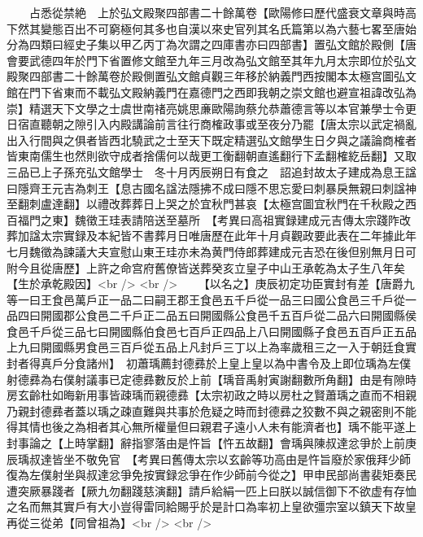 　　占悉從禁絶　上於弘文殿聚四部書二十餘萬卷【歐陽修曰歷代盛衰文章與時高下然其變態百出不可窮極何其多也自漢以來史官列其名氏篇第以為六藝七畧至唐始分為四類曰經史子集以甲乙丙丁為次謂之四庫書亦曰四部書】置弘文館於殿側【唐會要武德四年於門下省置修文館至九年三月改為弘文館至其年九月太宗即位於弘文殿聚四部書二十餘萬卷於殿側置弘文館貞觀三年移於納義門西按閣本太極宫圖弘文館在門下省東而不載弘文殿納義門在嘉德門之西即我朝之崇文館也避宣祖諱改弘為崇】精選天下文學之士虞世南禇亮姚思亷歐陽詢蔡允恭蕭德言等以本官兼學士令更日宿直聽朝之隙引入内殿講論前言往行商榷政事或至夜分乃罷【唐太宗以武定禍亂出入行間與之俱者皆西北驍武之士至天下既定精選弘文館學生日夕與之議論商榷者皆東南儒生也然則欲守成者捨儒何以哉更工衡翻朝直遙翻行下孟翻榷紇岳翻】又取三品已上子孫充弘文館學士　冬十月丙辰朔日有食之　詔追封故太子建成為息王諡曰隱齊王元吉為刺王【息古國名諡法隱拂不成曰隱不思忘愛曰刺暴戾無親曰刺諡神至翻刺盧達翻】以禮改葬葬日上哭之於宜秋門甚哀【太極宫圖宜秋門在千秋殿之西百福門之東】魏徵王珪表請陪送至墓所　【考異曰高祖實録建成元吉傳太宗踐阼改葬加諡太宗實録及本紀皆不書葬月日唯唐歷在此年十月貞觀政要此表在二年據此年七月魏徵為諫議大夫宣慰山東王珪亦未為黄門侍郎葬建成元吉恐在後但别無月日可附今且從唐歷】上許之命宫府舊僚皆送葬癸亥立皇子中山王承乾為太子生八年矣【生於承乾殿因】<br />
<br />
　　【以名之】庚辰初定功臣實封有差【唐爵九等一曰王食邑萬戶正一品二曰嗣王郡王食邑五千戶從一品三曰國公食邑三千戶從一品四曰開國郡公食邑二千戶正二品五曰開國縣公食邑千五百戶從二品六曰開國縣侯食邑千戶從三品七曰開國縣伯食邑七百戶正四品上八曰開國縣子食邑五百戶正五品上九曰開國縣男食邑三百戶從五品上凡封戶三丁以上為率歲租三之一入于朝廷食實封者得真戶分食諸州】　初蕭瑀薦封德彞於上皇上皇以為中書令及上即位瑀為左僕射德彞為右僕射議事已定德彞數反於上前【瑀音禹射寅謝翻數所角翻】由是有隙時房玄齡杜如晦新用事皆疎瑀而親德彞【太宗初政之時以房杜之賢蕭瑀之直而不相親乃親封德彞者蓋以瑀之疎直難與共事於危疑之時而封德彞之狡數不與之親密則不能得其情也後之為相者其心無所權量但曰親君子遠小人未有能濟者也】瑀不能平遂上封事論之【上時掌翻】辭指寥落由是忤旨【忤五故翻】會瑀與陳叔達忿爭於上前庚辰瑀叔達皆坐不敬免官　【考異曰舊傳太宗以玄齡等功高由是忤旨廢於家俄拜少師復為左僕射坐與叔達忿爭免按實録忿爭在作少師前今從之】甲申民部尚書裴矩奏民遭突厥暴踐者【厥九勿翻踐慈演翻】請戶給絹一匹上曰朕以誠信御下不欲虚有存恤之名而無其實戶有大小豈得雷同給賜乎於是計口為率初上皇欲彊宗室以鎮天下故皇再從三從弟【同曾祖為】<br />
<br />
